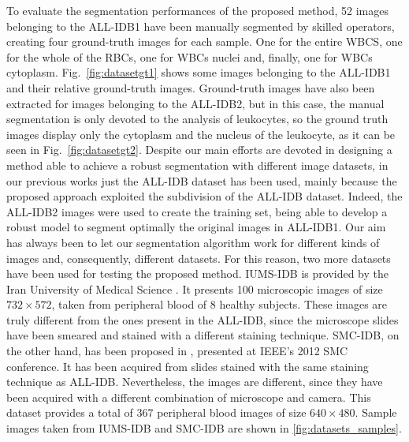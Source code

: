 To evaluate the segmentation performances of the proposed method, 52 images belonging to the ALL-IDB1 have been manually segmented by skilled operators, creating four ground-truth images for each sample. One for the entire WBCS, one for the whole of the RBCs, one for WBCs nuclei and, finally, one for WBCs cytoplasm. Fig.~\ref{fig:datasetgt1} shows some images belonging to the ALL-IDB1 and their relative ground-truth images. Ground-truth images have also been extracted for images belonging to the ALL-IDB2, but in this case, the manual segmentation is only devoted to the analysis of leukocytes, so the ground truth images display only the cytoplasm and the nucleus of the leukocyte, as it can be seen in Fig.~\ref{fig:datasetgt2}.
Despite our main efforts are devoted in designing a method able to achieve a robust segmentation with different image datasets, in our previous works \cite{Put15c, Put15d}  just the ALL-IDB dataset has been used, mainly because the proposed approach exploited the subdivision of the ALL-IDB dataset. Indeed, the ALL-IDB2 images were used to create the training set, being able to develop a robust model to segment optimally the original images in ALL-IDB1. Our aim has always been to let our segmentation algorithm work for different kinds of images and, consequently, different datasets. 
For this reason, two more datasets have been used for testing the proposed method. 
IUMS-IDB is provided by the Iran University of Medical Science \cite{Sarrafzadeh}. It presents 100 microscopic images of size $732 \times 572$, taken from peripheral blood of 8 healthy subjects. These images are truly different from the ones present in the ALL-IDB, since the microscope slides have been smeared and stained with a different staining technique. SMC-IDB, on the other hand, has been proposed in \cite{Mohamed}, presented at IEEE's 2012 SMC conference. It has been acquired from slides stained with the same staining technique as ALL-IDB. Nevertheless, the images are different, since they have been acquired with a different combination of microscope and camera. This dataset provides a total of 367 peripheral blood images of size $640 \times 480$.
Sample images taken from IUMS-IDB and SMC-IDB are shown in \ref{fig:datasets_samples}.

